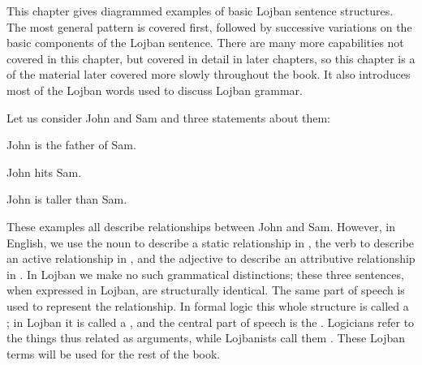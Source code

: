This chapter gives diagrammed examples of basic Lojban sentence structures. The most general pattern is covered first, followed by successive variations on the basic components of the Lojban sentence. There are many more capabilities not covered in this chapter, but covered in detail in later chapters, so this chapter is a  of the material later covered more slowly throughout the book. It also introduces most of the Lojban words used to discuss Lojban grammar.

Let us consider John and Sam and three statements about them:
\begin{example}
John is the father of Sam.
\end{example}

\begin{example}
John hits Sam.
\end{example}

\begin{example}
John is taller than Sam.
\end{example}

These examples all describe relationships between John and Sam. However, in English, we use the noun  to describe a static relationship in , the verb  to describe an active relationship in , and the adjective  to describe an attributive relationship in . In Lojban we make no such grammatical distinctions; these three sentences, when expressed in Lojban, are structurally identical. The same part of speech is used to represent the relationship. In formal logic this whole structure is called a ; in Lojban it is called a , and the central part of speech is the . Logicians refer to the things thus related as arguments, while Lojbanists call them . These Lojban terms will be used for the rest of the book. 

\begin{diagram}
\end{diagram}

